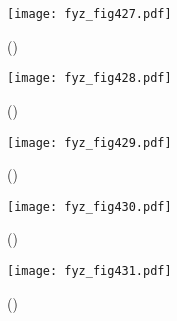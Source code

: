 {  \begin{figure}[ht!] %
    \centering
    \texttt{[image: fyz\_fig427.pdf]}
    \caption{
             (\cite[s.~697]{Feynman01})}
    \label{fyz:fig427}
  \end{figure}
  
  \begin{figure}[ht!] %
    \centering
    \texttt{[image: fyz\_fig428.pdf]}
    \caption{
             (\cite[s.~697]{Feynman01})}
    \label{fyz:fig428}
  \end{figure}

  \begin{figure}[ht!] %
    \centering
    \texttt{[image: fyz\_fig429.pdf]}
    \caption{
             (\cite[s.~697]{Feynman01})}
    \label{fyz:fig429}
  \end{figure}

  \begin{figure}[ht!] %
    \centering
    \texttt{[image: fyz\_fig430.pdf]}
    \caption{
             (\cite[s.~697]{Feynman01})}
    \label{fyz:fig430}
  \end{figure}

  \begin{figure}[ht!] %
    \centering
    \texttt{[image: fyz\_fig431.pdf]}
    \caption{
             (\cite[s.~697]{Feynman01})}
    \label{fyz:fig431}
  \end{figure}
  
  
} %
\printbibliography[title={Seznam literatury}, heading=subbibliography]

